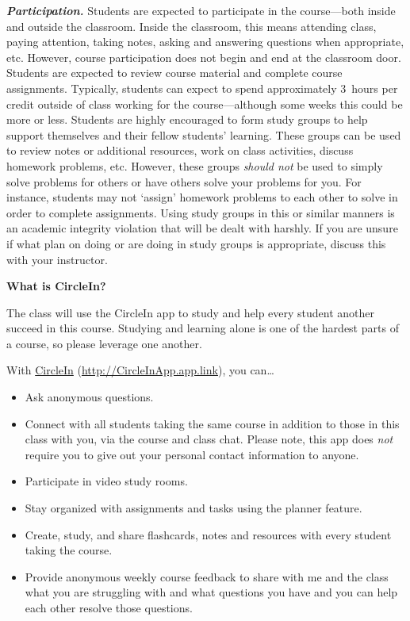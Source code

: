 \documentclass[11pt,letterpaper]{article}
\begin{document}
{\itshape\bfseries\color{scred}Participation.} Students are expected to participate in the course---both inside and outside the classroom. Inside the classroom, this means attending class, paying attention, taking notes, asking and answering questions when appropriate, etc. However, course participation does not begin and end at the classroom door. Students are expected to review course material and complete course assignments. Typically, students can expect to spend approximately 3~hours per credit outside of class working for the course---although some weeks this could be more or less. Students are highly encouraged to form study groups to help support themselves and their fellow students' learning. These groups can be used to review notes or additional resources, work on class activities, discuss homework problems, etc. However, these groups {\itshape should not} be used to simply solve problems for others or have others solve your problems for you. For instance, students may not `assign' homework problems to each other to solve in order to complete assignments. Using study groups in this or similar manners is an academic integrity violation that will be dealt with harshly. If you are unsure if what plan on doing or are doing in study groups is appropriate, discuss this with your instructor. \sectionbreak




{\bfseries What is CircleIn?} \par
The class will use the CircleIn app to study and help every student another succeed in this course. Studying and learning alone is one of the hardest parts of a course, so please leverage one another. \par\vspace{0.3cm}

With \href{http://CircleInApp.app.link}{CircleIn} (\url{http://CircleInApp.app.link}), you can\dots
	\begin{itemize}
	\item Ask anonymous questions.
	\item Connect with all students taking the same course in addition to those in this class with you, via the course and class chat. Please note, this app does {\itshape not} require you to give out your personal contact information to anyone.
	\item Participate in video study rooms.
	\item Stay organized with assignments and tasks using the planner feature.
	\item Create, study, and share flashcards, notes and resources with every student taking the course.
	\item Provide anonymous weekly course feedback to share with me and the class what you are struggling with and what questions you have and you can help each other resolve those questions. 
	\end{itemize}
\end{document}
